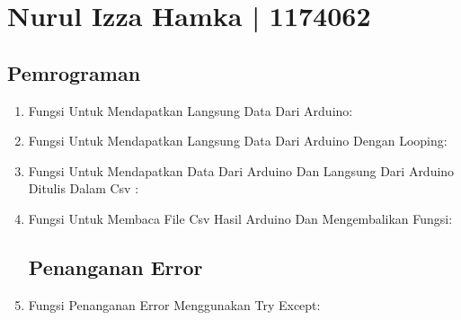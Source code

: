 
\section{Nurul Izza Hamka | 1174062}
\subsection{Pemrograman}
\begin{enumerate}

\item Fungsi Untuk Mendapatkan Langsung Data Dari Arduino:


\item Fungsi Untuk Mendapatkan Langsung Data Dari Arduino Dengan Looping:


\item Fungsi Untuk Mendapatkan Data Dari Arduino Dan Langsung Dari Arduino Ditulis Dalam Csv :


\item Fungsi Untuk Membaca File Csv Hasil Arduino Dan Mengembalikan Fungsi:


\subsection{Penanganan Error}

\item Fungsi Penanganan Error Menggunakan Try Except:



\end{enumerate}


